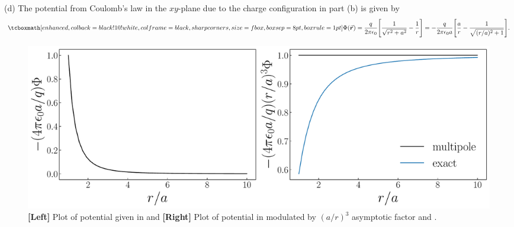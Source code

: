 {(d) The potential from Coulomb's law in the $xy$-plane due to the charge configuration in part (b) is given by
\begin{eqnarray}
    \label{eq:exact-coulomb}
    \eqbox{ \Phi(\va*{r}) = \frac{q}{2 \pi \epsilon_0} \Bigg[ \frac{1}{\sqrt{r^2 + a^2}} - \frac{1}{r} \Bigg] = -\frac{q}{2 \pi \epsilon_0 a} \Bigg[ \frac{a}{r} - \frac{1}{\sqrt{(r/a)^2 + 1}} \Bigg] }
.\end{eqnarray}

\begin{figure}[h!tb]
   \centering
   \includegraphics[width=\textwidth]{prob2.pdf}
   \caption{\textbf{[Left]} Plot of potential given in  and \textbf{[Right]} Plot of potential in  modulated by $(a/r)^3$ asymptotic factor and .}
   \label{fig:prob2}
\end{figure}



}




